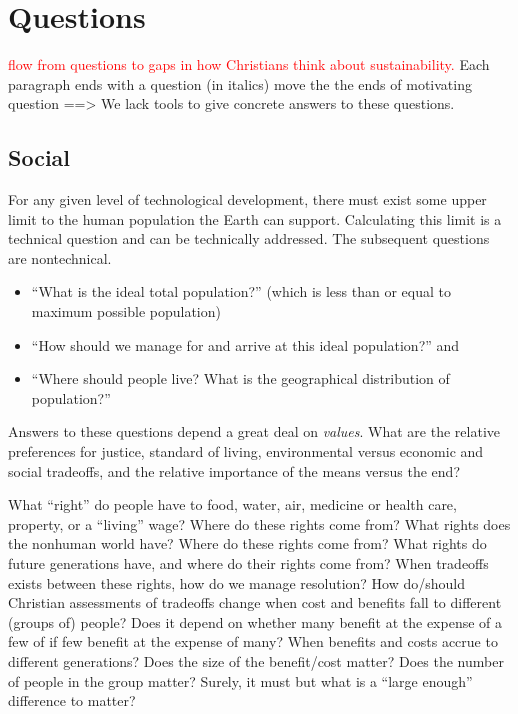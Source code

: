 \documentclass[12pt]{article}
\newcommand{\ins}[1]{\textcolor{red}{#1}}
\begin{document}
\section{Questions}
\label{sec:questions}

\ins{flow from questions to gaps in how Christians think about sustainability.}
Each paragraph ends with a question (in italics) 
move the the ends of motivating question ==> We lack tools to give concrete answers to these questions.

\subsection{Social}
For any given level of technological development, there must exist some upper limit to the human population the Earth
can support. Calculating this limit is a technical question and can be technically addressed. The subsequent questions are nontechnical.
\begin{itemize}
\item ``What is the ideal total population?'' (which is less than or equal to maximum possible population) %
\item ``How should we manage for and arrive at this ideal population?'' and %
\item ``Where should people live? What is the geographical distribution of population?'' %
\end{itemize}
Answers to these questions depend a great deal on \emph{values}. What are the relative preferences for justice, standard of living, 
environmental versus economic and social tradeoffs, and the relative importance of the means versus the end?

What ``right'' do people have to food, water, air, medicine or health care, property, or a ``living'' wage? 
Where do these rights come from? What rights does the nonhuman world have? Where do these rights come from?
What rights do future generations have, and where do their rights come from? %
When tradeoffs exists between these rights, how do we manage resolution?
How do/should Christian assessments of tradeoffs change when cost and benefits fall to different (groups of) people?
Does it depend on whether many benefit at the expense of a few of if few benefit at the expense of many? 
When benefits and costs accrue to different generations? 
Does the size of the benefit/cost matter? 
Does the number of people in the group matter? Surely, it must but what is a ``large enough'' difference to matter?
\end{document}
